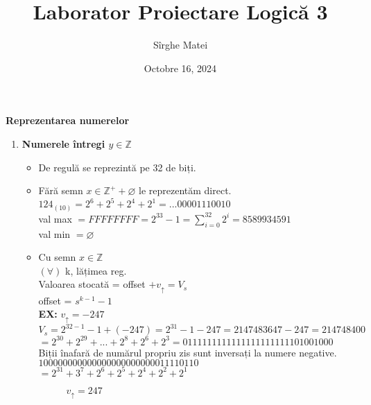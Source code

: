 \documentclass[12pt]{article}
\title{\bfseries Laborator Proiectare Logică 3}
\author{Sîrghe Matei}
\date{Octobre 16, 2024}
\begin{document}
\maketitle

\begin{center}
    \large \textbf{Reprezentarea numerelor}
\end{center}

\begin{enumerate}[label=(\alph*)]
    \item { \textbf{Numerele întregi $ y \in \mathbb{Z} $}
        \begin{itemize}
            \item De regulă se reprezintă pe 32 de biți.
            \item { Fără semn $ x \in \mathbb{Z^{+}}+{\varnothing}$ le reprezentăm direct.\\
            $ 124_{(10)}=2^{6}+2^{5}+2^{4}+2^{1}=...00001110010 $\\
            val max $= FFFFFFFF=2^{33}-1 = \sum_{i=0}^{32}2^{i}=8589934591$\\
            val min $= \varnothing $
            }
            \item {Cu semn $ x \in \mathbb{Z}$\\
            $(\forall)$ k, lățimea reg.\\
            Valoarea stocată = offset $+ v_{\uparrow}=V_{s}$\\
            offset = $s^{k-1}-1$\\
            \textbf{EX:} $ v_{\uparrow} = -247 $\\
            $ V_{s}=2^{32-1}-1+(-247) = 2^{31}-1-247 =2147483647-247=214748400 $\\
            $ = 2^30+2^29+...+2^8+2^6+2^3=0111111111111111111111101001000$\\
            Biții înafară de numărul propriu zis sunt inversați la numere negative.\\
            $100000000000000000000000011110110$\\
            $=2^31+3^7+2^6+2^5+2^4+2^2+2^1$\\
            
            \begin{figure}[h!]
                \begin{minipage}{0.5\textwidth}
                    \hspace{2cm} $ v_{\uparrow}=247$
                \end{minipage}
                \hfill
                \begin{minipage}{0.4\textwidth}
\end{minipage}
\end{figure}}
\end{itemize}}
\end{enumerate}
\end{document}
